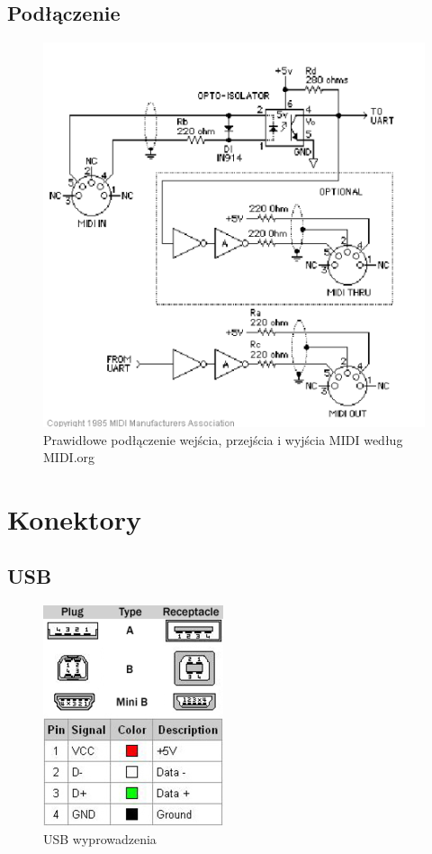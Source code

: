 \documentclass{article}
\begin{document}
\subsection{Podłączenie}
\begin{figure}[H]
	\center
	\includegraphics[scale=0.9]{img/MIDI_connection.png}
	\caption{Prawidłowe podłączenie wejścia, przejścia i wyjścia MIDI według MIDI.org}
	\label{fig:img6}
\end{figure}

\section{Konektory}
\subsection{USB}
\begin{figure}[H]
	\center
	\includegraphics[scale=0.9]{img/usb-pinout.png}
	\caption{USB wyprowadzenia}
	\label{fig:img7}
\end{figure}
\end{document}
